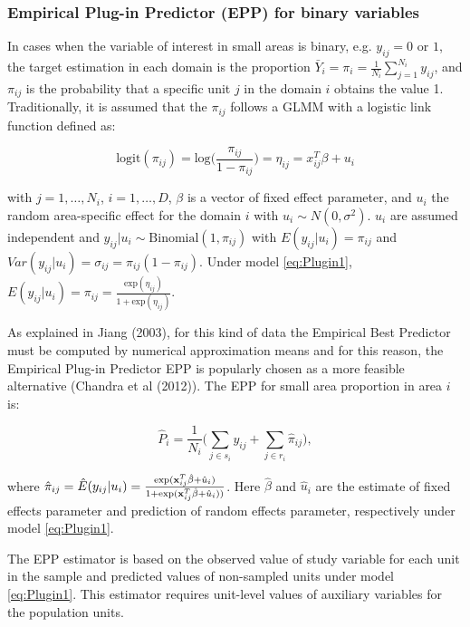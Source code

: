 \documentclass[a4paper, 11pt]{article}
\begin{document}
\subsubsection{Empirical Plug-in Predictor (EPP) for binary variables}
    
     In cases when the variable of interest in small areas is binary, e.g. $y_{ij} =0$ or $1$, the target estimation in each domain is the proportion $\bar{Y}_i = \pi_i = \frac{1}{N_i} \sum_{j=1}^{N_i} y_{ij} $, and $\pi_{ij}$ is the probability that a specific unit $j$ in the domain $i$ obtains the value 1. Traditionally, it is assumed that the $\pi_{ij}$ follows a GLMM with a logistic link function defined as: 

    \begin{equation}\label{eq:Plugin1}
        \text{logit}(\pi_{ij}) = \text{log} \Big (   \frac{\pi_{ij}} {1-\pi_{ij}} \Big) = \eta_{ij} = x^T_{ij}\beta + u_i
    \end{equation}
     
    with $j=1, \dots, N_i$, $i=1, \dots, D$, $\beta$ is a vector of fixed effect parameter, and $u_i$ the random area-specific effect for the domain $i$ with $u_i \sim N(0,\sigma^2)$. $u_i$ are assumed independent and $y_{ij}|u_i \sim \text{Binomial}(1, \pi_{ij})$ with $E(y_{ij}|u_i) = \pi_{ij}$ and $Var(y_{ij}|u_i) = \sigma_{ij}=\pi_{ij}(1-\pi_{ij})$. Under model \ref{eq:Plugin1}, $E(y_{ij}|u_i) = \pi_{ij} = \frac{\text{exp}(\eta_{ij})} {{1+\text{exp}(\eta_{ij})}}$. 
    
    As explained in Jiang (2003), for this kind of data the Empirical Best Predictor must be computed by numerical approximation means and for this reason, the Empirical Plug-in Predictor EPP is popularly chosen as a more feasible alternative (Chandra et al (2012)). The EPP for small area proportion in area $i$ is: 
    
    \begin{equation}
        \hat{P}_i = \frac{1}{N_i} \big( \sum_{j \in s_i} y_{ij}+\sum_{j \in r_i} \hat{\pi}_{ij} \big),
    \end{equation}
    
    where $\hat{\pi}_{ij}= \hat{E}(y_{ij}|u_i)= \frac{\text{exp}(\bold{x}^{T}_{ij}\hat{\beta}+\hat{u}_i)} {{1+\text{exp}(\bold{x}^{T}_{ij}\hat{\beta}+\hat{u}_i))}}$. Here $\hat{\beta}$ and $\hat{u}_i$ are the estimate of fixed effects parameter and prediction of random effects parameter, respectively under model \ref{eq:Plugin1}.
    
    The EPP estimator is based on the observed value of study variable for each unit in the sample and predicted values of non-sampled units under model \ref{eq:Plugin1}. This estimator requires unit-level values of auxiliary variables for the population units. 
     
\end{document}
